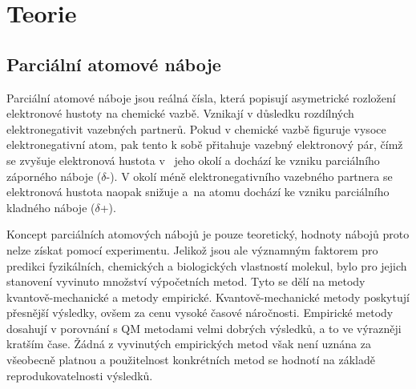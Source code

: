 \chapter{Teorie}

% 
% 
% 
% 
% 

\section{Parciální atomové náboje}

Parciální atomové náboje jsou reálná čísla, která popisují asymetrické rozložení elektronové hustoty na chemické vazbě. Vznikají v důsledku rozdílných elektronegativit vazebných partnerů. Pokud v chemické vazbě figuruje vysoce elektronegativní atom, pak tento k sobě přitahuje vazebný elektronový pár, čímž se zvyšuje elektronová hustota v~ jeho okolí a dochází ke vzniku parciálního záporného náboje ($\delta$-). V okolí méně elektronegativního vazebného partnera se elektronová hustota naopak snižuje a~na atomu dochází ke vzniku parciálního kladného náboje ($\delta$+). 

Koncept parciálních atomových nábojů je pouze teoretický, hodnoty nábojů proto nelze získat pomocí experimentu. Jelikož jsou ale významným faktorem pro predikci fyzikálních, chemických a biologických vlastností molekul, bylo pro jejich stanovení vyvinuto množství výpočetních metod. Tyto se dělí na metody kvantově-mechanické a metody empirické. Kvantově-mechanické metody poskytují přesnější výsledky, ovšem za cenu vysoké časové náročnosti. Empirické metody dosahují v porovnání s QM metodami velmi dobrých výsledků, a to ve výrazněji kratším čase. Žádná z vyvinutých empirických metod však není uznána za všeobecně platnou a použitelnost konkrétních metod se hodnotí na základě reprodukovatelnosti výsledků.  

